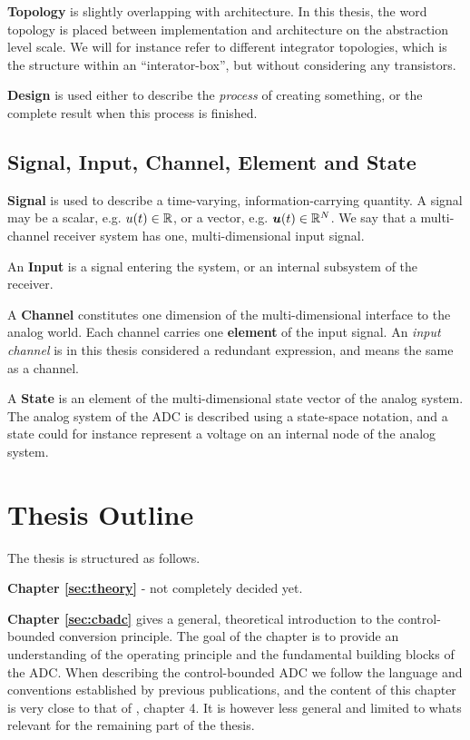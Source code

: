 \textbf{Topology} is slightly overlapping with architecture. In this thesis, the word topology is placed between implementation and architecture on the abstraction level scale. We will for instance refer to different integrator topologies, which is the structure within an \enquote{interator-box}, but without considering any transistors.

\textbf{Design} is used either to describe the \textit{process} of creating something, or the complete result when this process is finished.


\subsection{Signal, Input, Channel, Element and State}
\textbf{Signal} is used to describe a time-varying, information-carrying quantity. A signal may be a scalar, e.g. $u(t) \in \mathbb{R}$, or a vector, e.g. $\bm{u}(t) \in \mathbb{R}^N$. We say that a multi-channel receiver system has one, multi-dimensional input signal.

An \textbf{Input} is a signal entering the system, or an internal subsystem of the receiver.

A \textbf{Channel} constitutes one dimension of the multi-dimensional interface to the analog world. Each channel carries one \textbf{element} of the input signal. An \textit{input channel} is in this thesis considered a redundant expression, and means the same as a channel.

A \textbf{State} is an element of the multi-dimensional state vector of the analog system. The analog system of the ADC is described using a state-space notation, and a state could for instance represent a voltage on an internal node of the analog system.






\section{Thesis Outline}
The thesis is structured as follows.

\textbf{Chapter \ref{sec:theory}} - not completely decided yet.

\textbf{Chapter \ref{sec:cbadc} }gives a general, theoretical introduction to the control-bounded conversion principle. The goal of the chapter is to provide an understanding of the operating principle and the fundamental building blocks of the ADC. When describing the control-bounded ADC we follow the language and conventions established by previous publications, and the content of this chapter is very close to that of \cite{malmberg_thesis}, chapter 4. It is however less general and limited to whats relevant for the remaining part of the thesis.

